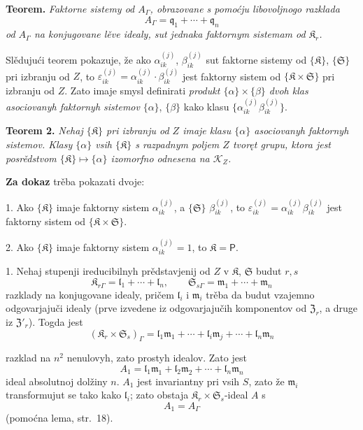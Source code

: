 \documentclass[11pt]{article}
\begin{document}
\textbf{Teorem.} \emph{Faktorne sistemy od \(A_\Gamma\), obrazovane s pomoćju libovoljnogo razklada}
\[
A_\Gamma=\mathfrak q_1+\cdots+\mathfrak q_n
\]
\emph{od \(A_\Gamma\) na konjugovane lěve idealy, sut jednaka faktornym sistemam od \(\mathfrak K_r\).}

Slědujući teorem pokazuje, že ako \(\alpha_{ik}^{(j)}\), \(\beta_{ik}^{(j)}\) sut faktorne sistemy od \(\{\mathfrak K\}\), \(\{\mathfrak S\}\) pri izbranju od \(Z\), to \(\varepsilon_{ik}^{(j)}=\alpha_{ik}^{(j)}\cdot\beta_{ik}^{(j)}\) jest faktorny sistem od \(\{\mathfrak K\times\mathfrak S\}\) pri izbranju od \(Z\). Zato imaje smysl definirati \emph{produkt \(\{\alpha\}\times\{\beta\}\) dvoh klas asociovanyh faktornyh sistemov} \(\{\alpha\}\), \(\{\beta\}\) kako klasu \(\{\alpha_{ik}^{(j)}\beta_{ik}^{(j)}\}\).

\textbf{Teorem 2.} \emph{Nehaj \(\{\mathfrak K\}\) pri izbranju od \(Z\) imaje klasu \(\{\alpha\}\) asociovanyh faktornyh sistemov. Klasy \(\{\alpha\}\) vsih \(\{\mathfrak K\}\) s razpadnym poljem \(Z\) tvoręt grupu, ktora jest posrědstvom \(\{\mathfrak K\}\mapsto\{\alpha\}\) izomorfno odnesena na \(\mathscr K_Z\).}

\textbf{Za dokaz} trěba pokazati dvoje:

1. Ako \(\{\mathfrak K\}\) imaje faktorny sistem \(\alpha_{ik}^{(j)}\), a \(\{\mathfrak S\}\) \(\beta_{ik}^{(j)}\), to \(\varepsilon_{ik}^{(j)}=\alpha_{ik}^{(j)}\beta_{ik}^{(j)}\) jest faktorny sistem od \(\{\mathfrak K\times\mathfrak S\}\).

2. Ako \(\{\mathfrak K\}\) imaje faktorny sistem \(\alpha_{ik}^{(j)}=1\), to \(\mathfrak K=\mathsf P\).

1. Nehaj stupenji ireducibilnyh prědstavjenij od \(Z\) v \(\mathfrak K\), \(\mathfrak S\) budut \(r,s\)
\[
\mathfrak K_{r\Gamma}=\mathfrak l_1+\cdots+\mathfrak l_n,\qquad
\mathfrak S_{s\Gamma}=\mathfrak m_1+\cdots+\mathfrak m_n
\]
razklady na konjugovane idealy, pričem \(\mathfrak l_i\) i \(\mathfrak m_i\) trěba da budut vzajemno odgovarjajuči idealy (prve izvedene iz odgovarjajučih komponentov od \(\mathfrak Z_r\), a druge iz \(\mathfrak Z'_r\)). Togda jest
\[
(\mathfrak K_r\times\mathfrak S_s)_\Gamma
=\mathfrak l_1\mathfrak m_1+\cdots+\mathfrak l_i\mathfrak m_j+\cdots+\mathfrak l_n\mathfrak m_n
\]

razklad na \(n^2\) nenulovyh, zato prostyh idealov. Zato jest
\[
A_1=\mathfrak l_1\mathfrak m_1+\mathfrak l_2\mathfrak m_2+\cdots+\mathfrak l_n\mathfrak m_n
\]
ideal absolutnoj dolžiny \(n\). \(A_1\) jest invariantny pri vsih \(S\), zato že \(\mathfrak m_i\) transformujut se tako kako \(\mathfrak l_i\); zato obstaja \(\mathfrak K_r\times\mathfrak S_s\)-ideal \(A\) s
\[
A_1=A_\Gamma
\]
(pomoćna lema, str.~18).
\end{document}
